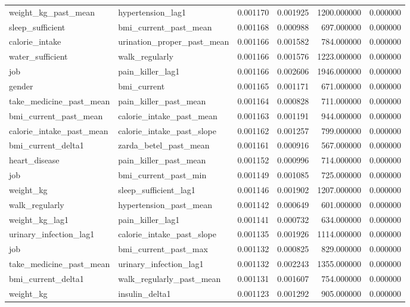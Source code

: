 \begin{longtable}{llrrrr}
weight\_kg\_past\_mean & hypertension\_lag1 & 0.001170 & 0.001925 & 1200.000000 & 0.000000 \\
sleep\_sufficient & bmi\_current\_past\_mean & 0.001168 & 0.000988 & 697.000000 & 0.000000 \\
calorie\_intake & urination\_proper\_past\_mean & 0.001166 & 0.001582 & 784.000000 & 0.000000 \\
water\_sufficient & walk\_regularly & 0.001166 & 0.001576 & 1223.000000 & 0.000000 \\
job & pain\_killer\_lag1 & 0.001166 & 0.002606 & 1946.000000 & 0.000000 \\
gender & bmi\_current & 0.001165 & 0.001171 & 671.000000 & 0.000000 \\
take\_medicine\_past\_mean & pain\_killer\_past\_mean & 0.001164 & 0.000828 & 711.000000 & 0.000000 \\
bmi\_current\_past\_mean & calorie\_intake\_past\_mean & 0.001163 & 0.001191 & 944.000000 & 0.000000 \\
calorie\_intake\_past\_mean & calorie\_intake\_past\_slope & 0.001162 & 0.001257 & 799.000000 & 0.000000 \\
bmi\_current\_delta1 & zarda\_betel\_past\_mean & 0.001161 & 0.000916 & 567.000000 & 0.000000 \\
heart\_disease & pain\_killer\_past\_mean & 0.001152 & 0.000996 & 714.000000 & 0.000000 \\
job & bmi\_current\_past\_min & 0.001149 & 0.001085 & 725.000000 & 0.000000 \\
weight\_kg & sleep\_sufficient\_lag1 & 0.001146 & 0.001902 & 1207.000000 & 0.000000 \\
walk\_regularly & hypertension\_past\_mean & 0.001142 & 0.000649 & 601.000000 & 0.000000 \\
weight\_kg\_lag1 & pain\_killer\_lag1 & 0.001141 & 0.000732 & 634.000000 & 0.000000 \\
urinary\_infection\_lag1 & calorie\_intake\_past\_slope & 0.001135 & 0.001926 & 1114.000000 & 0.000000 \\
job & bmi\_current\_past\_max & 0.001132 & 0.000825 & 829.000000 & 0.000000 \\
take\_medicine\_past\_mean & urinary\_infection\_lag1 & 0.001132 & 0.002243 & 1355.000000 & 0.000000 \\
bmi\_current\_delta1 & walk\_regularly\_past\_mean & 0.001131 & 0.001607 & 754.000000 & 0.000000 \\
weight\_kg & insulin\_delta1 & 0.001123 & 0.001292 & 905.000000 & 0.000000 \\

\end{longtable}
